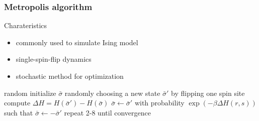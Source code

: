 \documentclass[notheorems]{beamer}
\begin{document}
\begin{frame}
\frametitle{Metropolis algorithm}
\begin{block}{Charateristics}
\begin{itemize}
	\item commonly used to simulate Ising model
	\item single-spin-flip dynamics 
	\item stochastic method for optimization
\end{itemize}
\end{block}
	\begin{algorithmic}[1]
	\STATE random initialize $\bar{\sigma}$
	\STATE randomly choosing a new state $\bar{\sigma}'$ by flipping one spin site
	\STATE compute $\Delta H= H(\bar{\sigma}') - H(\bar{\sigma})$
	\STATE $\bar{\sigma} \leftarrow \bar{\sigma}'$
	\ELSE
	\STATE with probability $\exp(-\beta \Delta H(r,s))$ 
	such that $\bar{\sigma} \leftarrow -\bar{\sigma}'$ 
	\ENDIF
	\STATE repeat 2-8 until convergence
\end{algorithmic}
\end{frame}
\end{document}
